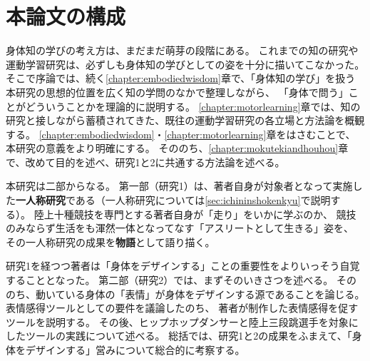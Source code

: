 \section{本論文の構成}
身体知の学びの考え方は、まだまだ萌芽の段階にある。
これまでの知の研究や運動学習研究は、必ずしも身体知の学びとしての姿を十分に描いてこなかった。
そこで序論では、続く\ref{chapter:embodiedwisdom}章で、「身体知の学び」を扱う本研究の思想的位置を広く知の学問のなかで整理しながら、
「身体で問う」ことがどういうことかを理論的に説明する。
\ref{chapter:motorlearning}章では、知の研究と接しながら蓄積されてきた、既往の運動学習研究の各立場と方法論を概観する。
\ref{chapter:embodiedwisdom}・\ref{chapter:motorlearning}章をはさむことで、本研究の意義をより明確にする。
そののち、\ref{chapter:mokutekiandhouhou}章で、改めて目的を述べ、研究1と2に共通する方法論を述べる。

本研究は二部からなる。
第一部（研究1）は、著者自身が対象者となって実施した\textbf{一人称研究}\cite{suwa_hori:2015,suwa_fujii:2015,suwa:2016,suwa:2022}である（一人称研究については\ref{sec:ichininshokenkyu}で説明する）。
陸上十種競技を専門とする著者自身が「走り」をいかに学ぶのか、
競技のみならず生活をも渾然一体となってなす「アスリートとして生きる」\cite{horiuchi_suwa:2020}姿を、
その一人称研究の成果を\textbf{物語}\cite{horiuchi_suwa:2020}として語り描く。

研究1を経つつ著者は「身体をデザインする」ことの重要性をよりいっそう自覚することとなった。
第二部（研究2）では、まずそのいきさつを述べる。
そののち、動いている身体の「表情」が身体をデザインする源であることを論じる。
表情感得ツールとしての要件を議論したのち、
著者が制作した表情感得を促すツールを説明する。
その後、ヒップホップダンサーと陸上三段跳選手を対象にしたツールの実践について述べる。
総括では、研究1と2の成果をふまえて、「身体をデザインする」営みについて総合的に考察する。